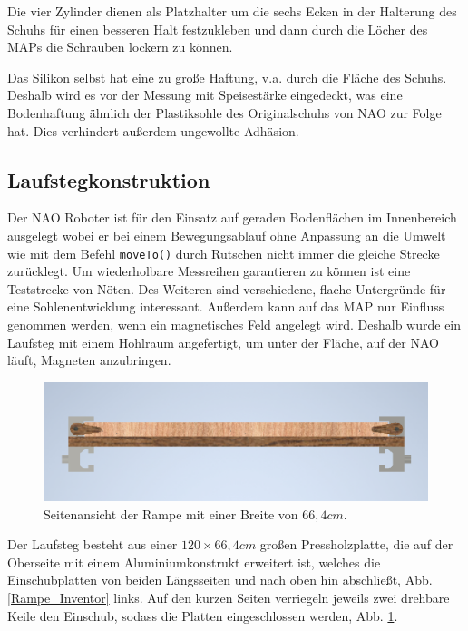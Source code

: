 Die vier Zylinder dienen als Platzhalter um die sechs Ecken in der Halterung des Schuhs für einen besseren Halt festzukleben und dann durch die Löcher des MAPs die Schrauben lockern zu können. 

Das Silikon selbst hat eine zu große Haftung, v.a. durch die Fläche des Schuhs. Deshalb wird es vor der Messung mit Speisestärke eingedeckt, was eine Bodenhaftung ähnlich der Plastiksohle des Originalschuhs von NAO zur Folge hat. Dies verhindert außerdem ungewollte Adhäsion.

\subsection{Laufstegkonstruktion} \FloatBarrier

Der NAO Roboter ist für den Einsatz auf geraden Bodenflächen im Innenbereich ausgelegt wobei er bei einem Bewegungsablauf ohne Anpassung an die Umwelt wie mit dem Befehl \texttt{moveTo()} durch Rutschen nicht immer die gleiche Strecke zurücklegt. 
Um wiederholbare Messreihen garantieren zu können ist eine Teststrecke von Nöten. Des Weiteren sind verschiedene, flache Untergründe für eine Sohlenentwicklung interessant.
Außerdem kann auf das MAP nur Einfluss genommen werden, wenn ein magnetisches Feld angelegt wird. Deshalb wurde ein Laufsteg mit einem Hohlraum angefertigt, um unter der Fläche, auf der NAO läuft, Magneten anzubringen. 

\begin{figure}
	\vspace{-0.5cm}
	\centering
	\includegraphics[width=\linewidth]{Bilder/Rampe_Seitenansicht3.png}
	\caption{Seitenansicht der Rampe mit einer Breite von $66,4 \unit{cm}$.}
	\label{Rampe_Seite_Inventor}
	\vspace{-0.5cm}
\end{figure}

Der Laufsteg besteht aus einer $120\times66,4 \unit{cm}$ großen Pressholzplatte, die auf der Oberseite mit einem Aluminiumkonstrukt erweitert ist, welches die Einschubplatten von beiden Längsseiten und nach oben hin abschließt, Abb. \ref{Rampe_Inventor} links. Auf den kurzen Seiten verriegeln jeweils zwei drehbare Keile den Einschub, sodass die Platten eingeschlossen werden, Abb. \ref{Rampe_Seite_Inventor}.

